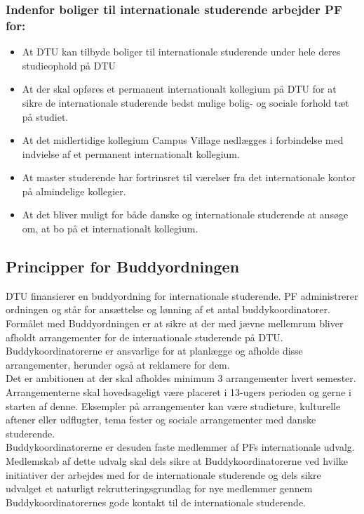 \subsubsection{Indenfor boliger til internationale studerende arbejder PF for:}
\begin{itemize}
\item At DTU kan tilbyde boliger til internationale studerende under hele deres studieophold på DTU
\item At der skal opføres et permanent internationalt kollegium på DTU for at sikre de internationale studerende bedst mulige bolig- og sociale forhold tæt på studiet.
\item At det midlertidige kollegium Campus Village nedlægges i forbindelse med indvielse af et permanent internationalt kollegium.
\item At master studerende har fortrinsret til værelser fra det internationale kontor på almindelige kollegier.
\item At det bliver muligt for både danske og internationale studerende at ansøge om, at bo på et internationalt kollegium.
\end{itemize}

\subsection{Principper for Buddyordningen}
DTU finansierer en buddyordning for internationale studerende. PF administrerer ordningen og står for ansættelse og lønning af et antal buddykoordinatorer. Formålet med Buddyordningen er at sikre at der med jævne mellemrum bliver afholdt arrangementer for de internationale studerende på DTU. Buddykoordinatorerne er ansvarlige for at planlægge og afholde disse arrangementer, herunder også at reklamere for dem.\\

Det er ambitionen at der skal afholdes minimum 3 arrangementer hvert semester. Arrangementerne skal hovedsageligt være placeret i 13-ugers perioden og gerne i starten af denne. Eksempler på arrangementer kan være studieture, kulturelle aftener eller udflugter, tema fester og sociale arrangementer med danske studerende.\\

Buddykoordinatorerne er desuden faste medlemmer af PFs internationale udvalg. Medlemskab af dette udvalg skal dels sikre at Buddykoordinatorerne ved hvilke initiativer der arbejdes med for de internationale studerende og dels sikre udvalget et naturligt rekrutteringsgrundlag for nye medlemmer gennem Buddykoordinatorernes gode kontakt til de internationale studerende.

